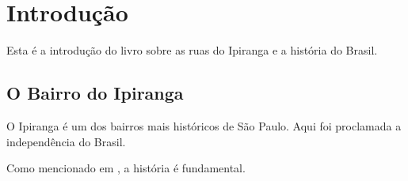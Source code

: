 \chapter{Introdução}
\label{chap:introducao}

Esta é a introdução do livro sobre as ruas do Ipiranga e a história do Brasil.

\section{O Bairro do Ipiranga}
O Ipiranga é um dos bairros mais históricos de São Paulo. Aqui foi proclamada a independência do Brasil.

\lipsum[1-2] %

Como mencionado em \cite{sample}, a história é fundamental.
